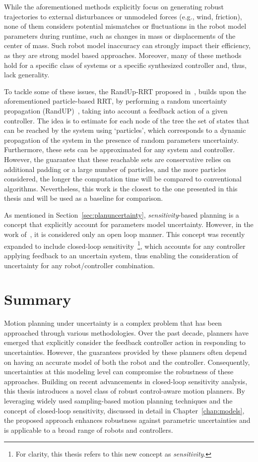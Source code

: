 While the aforementioned methods explicitly focus on generating robust trajectories to external disturbances or unmodeled forces (e.g., wind, friction), none of them considers potential mismatches or fluctuations in the robot model parameters during runtime, such as changes in mass or displacements of the center of mass.
Such robot model inaccuracy can strongly impact their efficiency, as they are strong model based approaches. 
Moreover, many of these methods hold for a specific class of systems or a specific synthesized controller and, thus, lack generality.

To tackle some of these issues, the RandUp-RRT proposed in~\cite{cRandUpRRT}, builds upon the aforementioned particle-based RRT, by performing a random uncertainty propagation (RandUP)~\cite{cRandUP}, taking into account a feedback action of a given controller.
The idea is to estimate for each node of the tree the set of states that can be reached by the system using `particles', which corresponds to a dynamic propagation of the system in the presence of random parameters uncertainty.
Furthermore, these sets can be approximated for any system and controller.
However, the guarantee that these reachable sets are conservative relies on additional padding or a large number of particles, and the more particles considered, the longer the computation time will be compared to conventional algorithms.
Nevertheless, this work is the closest to the one presented in this thesis and will be used as a baseline for comparison.

As mentioned in Section~\ref{sec:planuncertainty}, \emph{sensitivity}-based planning is a concept that explicitly account for parameters model uncertainty.
However, in the work of~\cite{cSensi1,cSensi2}, it is considered only an open loop manner.
This concept was recently expanded to include closed-loop sensitivity~\cite{cPi,cTh}\footnote{For clarity, this thesis refers to this new concept as \emph{sensitivity}.}, which accounts for any controller applying feedback to an uncertain system, thus enabling the consideration of uncertainty for any robot/controller combination. 

\section{Summary}

Motion planning under uncertainty is a complex problem that has been approached through various methodologies. 
Over the past decade, planners have emerged that explicitly consider the feedback controller action in responding to uncertainties. 
However, the guarantees provided by these planners often depend on having an accurate model of both the robot and the controller. 
Consequently, uncertainties at this modeling level can compromise the robustness of these approaches. 
Building on recent advancements in closed-loop sensitivity analysis, this thesis introduces a novel class of robust control-aware motion planners. 
By leveraging widely used sampling-based motion planning techniques and the concept of closed-loop sensitivity, discussed in detail in Chapter~\ref{chap:models}, the proposed approach enhances robustness against parametric uncertainties and is applicable to a broad range of robots and controllers. 